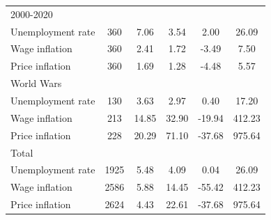 \begin{table}[htbp]
\begin{tabular}{l*{1}{ccccc}}
\hline
2000-2020           &            &            &            &            &            \\
Unemployment rate   &         360&        7.06&        3.54&        2.00&       26.09\\
Wage inflation      &         360&        2.41&        1.72&       -3.49&        7.50\\
Price inflation     &         360&        1.69&        1.28&       -4.48&        5.57\\
\hline
World Wars          &            &            &            &            &            \\
Unemployment rate   &         130&        3.63&        2.97&        0.40&       17.20\\
Wage inflation      &         213&       14.85&       32.90&      -19.94&      412.23\\
Price inflation     &         228&       20.29&       71.10&      -37.68&      975.64\\
\hline
Total               &            &            &            &            &            \\
Unemployment rate   &        1925&        5.48&        4.09&        0.04&       26.09\\
Wage inflation      &        2586&        5.88&       14.45&      -55.42&      412.23\\
Price inflation     &        2624&        4.43&       22.61&      -37.68&      975.64\\
\hline\hline
\end{tabular}
\end{table}
